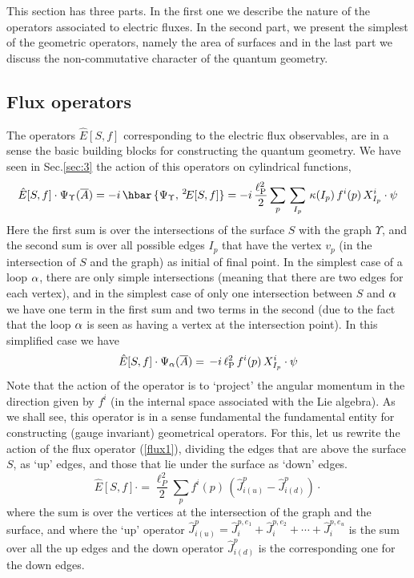 \documentclass[aps,prd,tightenlines,showpacs,nofootinbib,preprint]{revtex4}
\def\be{\begin{equation}}
\def\ee{\end{equation}}
\begin{document}
This section has three parts. In the first one we describe the
nature of the operators associated to electric fluxes. In the
second part, we present the simplest of the geometric operators,
namely the area of surfaces and in the last part we discuss the
non-commutative character of the quantum geometry.

\subsection{Flux operators}

The operators $\hat{E}[S,f]$ corresponding to the electric flux
observables, are in a sense the basic building blocks for
constructing the quantum geometry. We have seen in Sec.\ref{sec:3}
the action of this operators on cylindrical functions,
%
\be
 \hat{E}[S,f]\cdot\Psi_\Upsilon(\overline{A})=-i\,\hbar\,
\{ \Psi_\Upsilon, \, {}^2\!E[S,f] \} = -i\,\frac{\ell^2_{\rm
P}}{2} \sum_{p}\, \sum_{I_p}\, \kappa({I_p})\, f^i(p)\,
X^i_{I_p}\cdot \psi\label{flux1} \ee
%
Here the first sum is over the intersections of the surface $S$
with the graph $\Upsilon$, and the second sum is over all possible
edges $I_p$ that have the vertex $v_p$ (in the intersection of $S$
and the graph) as initial of final point. In the simplest case of
a loop ${\alpha}$, there are only simple intersections (meaning that
there are two edges for each vertex), and in the simplest case of
only one intersection between $S$ and ${\alpha}$ we have one term in the
first sum and two terms in the second (due to the fact that the
loop ${\alpha}$ is seen as having a vertex at the intersection point).
In this simplified case we have
%
\be
 \hat{E}[S,f]\cdot\Psi_\a(\overline{A})=\,
-i\,\ell^2_{\rm P} \,   f^i(p)\, X^i_{I_p}\cdot \psi
 \ee
Note that the action of the operator is to `project' the angular
momentum in the direction given by $f^i$ (in the internal space
associated with the Lie algebra). As we shall see, this operator
is in a sense fundamental the fundamental entity for constructing
(gauge invariant) geometrical operators. For this, let us rewrite
the action of the flux operator (\ref{flux1}), dividing the edges
that are above the surface $S$, as `up' edges, and those that lie
under the surface as `down' edges. \be
\hat{E}[S,f]\cdot=\frac{\ell^2_P}{2}\sum_p
f^i(p)\,(\hat{J}^{p}_{i(u)}- \hat{J}^{p}_{i(d)})\cdot \ee where
the sum is over the vertices at the intersection of the graph and
the surface, and where the `up' operator
$\hat{J}^{p}_{i(u)}=\hat{J}^{p,e_1}_{i}+
\hat{J}^{p,e_2}_{i}+\cdots+\hat{J}^{p,e_u}_{i}$ is the sum over
all the up edges and the down operator  $\hat{J}^{p}_{i(d)}$ is
the corresponding one for the down edges.
\end{document}
